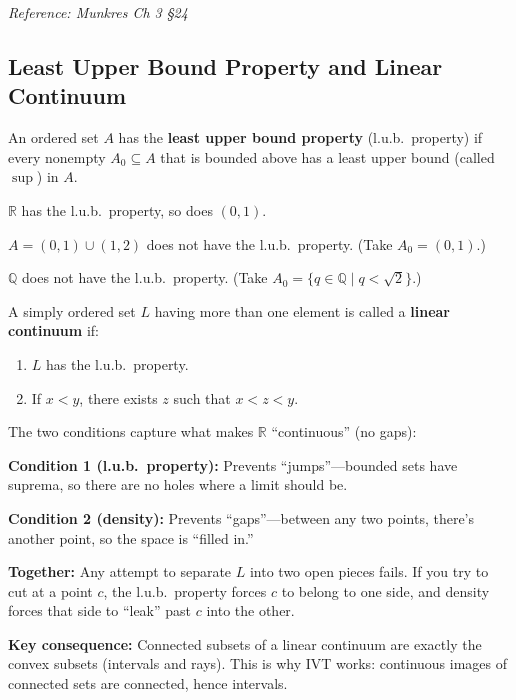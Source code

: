\documentclass[11pt]{report}
\begin{document}
\textit{Reference: Munkres Ch 3 \S 24}

\subsection{Least Upper Bound Property and Linear Continuum}

\begin{defbox}
An ordered set $A$ has the \textbf{least upper bound property} (l.u.b.\ property) if every nonempty $A_0 \subseteq A$ that is bounded above has a least upper bound (called $\sup$) in $A$.
\end{defbox}

\begin{exbox}
$\mathbb{R}$ has the l.u.b.\ property, so does $(0, 1)$.
\end{exbox}

\begin{exbox}
$A = (0, 1) \cup (1, 2)$ does not have the l.u.b.\ property. (Take $A_0 = (0, 1)$.)
\end{exbox}

\begin{exbox}
$\mathbb{Q}$ does not have the l.u.b.\ property. (Take $A_0 = \{q \in \mathbb{Q} \mid q < \sqrt{2}\}$.)
\end{exbox}

\begin{defbox}
A simply ordered set $L$ having more than one element is called a \textbf{linear continuum} if:
\begin{enumerate}
    \item $L$ has the l.u.b.\ property.
    \item If $x < y$, there exists $z$ such that $x < z < y$.
\end{enumerate}
\end{defbox}

\begin{rembox}
The two conditions capture what makes $\mathbb{R}$ ``continuous'' (no gaps):

\textbf{Condition 1 (l.u.b.\ property):} Prevents ``jumps''---bounded sets have suprema, so there are no holes where a limit should be.

\textbf{Condition 2 (density):} Prevents ``gaps''---between any two points, there's another point, so the space is ``filled in.''

\textbf{Together:} Any attempt to separate $L$ into two open pieces fails. If you try to cut at a point $c$, the l.u.b.\ property forces $c$ to belong to one side, and density forces that side to ``leak'' past $c$ into the other.

\textbf{Key consequence:} Connected subsets of a linear continuum are exactly the convex subsets (intervals and rays). This is why IVT works: continuous images of connected sets are connected, hence intervals.
\end{rembox}
\end{document}

